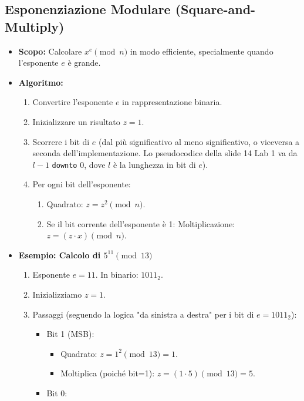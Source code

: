 \subsection{Esponenziazione Modulare (Square-and-Multiply)}
\begin{itemize}
    \item \textbf{Scopo:} Calcolare \(x^e \pmod{n}\) in modo efficiente, specialmente quando l'esponente \(e\) è grande.
    \item \textbf{Algoritmo:}
    \begin{enumerate}
        \item Convertire l'esponente \(e\) in rappresentazione binaria.
        \item Inizializzare un risultato \(z = 1\).
        \item Scorrere i bit di \(e\) (dal più significativo al meno significativo, o viceversa a seconda dell'implementazione. Lo pseudocodice della slide 14 Lab 1 va da \(l-1\) \texttt{downto} 0, dove \(l\) è la lunghezza in bit di \(e\)).
        \item Per ogni bit dell'esponente:
        \begin{enumerate}
            \item Quadrato: \(z = z^2 \pmod{n}\).
            \item Se il bit corrente dell'esponente è 1: Moltiplicazione: \(z = (z \cdot x) \pmod{n}\).
        \end{enumerate}
    \end{enumerate}
    \item \textbf{Esempio: Calcolo di \(5^{11} \pmod{13}\)}
    \begin{enumerate}
        \item Esponente \(e = 11\). In binario: \(1011_2\).
        \item Inizializziamo \(z = 1\).
        \item Passaggi (seguendo la logica "da sinistra a destra" per i bit di \(e=1011_2\)):
        \begin{itemize}
            \item Bit 1 (MSB):
                \begin{itemize}
                    \item Quadrato: \(z = 1^2 \pmod{13} = 1\).
                    \item Moltiplica (poiché bit=1): \(z = (1 \cdot 5) \pmod{13} = 5\).
                \end{itemize}
            \item Bit 0:

\end{itemize}
\end{enumerate}
\end{itemize}
